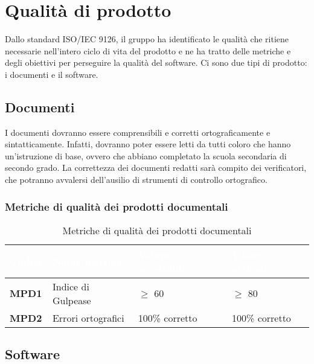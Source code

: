 \section{Qualità di prodotto}
Dallo standard ISO/IEC 9126, il gruppo \Gruppo{} ha identificato le qualità che ritiene necessarie nell'intero ciclo di vita del prodotto e ne ha tratto delle metriche e degli obiettivi per perseguire la qualità del software. Ci sono due tipi di prodotto: i documenti e il software.

\subsection{Documenti}
I documenti dovranno essere comprensibili e corretti ortograficamente e sintatticamente. Infatti, dovranno poter essere letti da tutti coloro che hanno un'istruzione di base, ovvero che abbiano completato la scuola secondaria di secondo grado. La correttezza dei documenti redatti sarà compito dei verificatori, che potranno avvalersi dell'ausilio di strumenti di controllo ortografico. 

\subsubsection{Metriche di qualità dei prodotti documentali}
\renewcommand{\arraystretch}{1.5}
\begin{longtable}{C{2.5cm} C{5.5cm} C{3.5cm} C{3.5cm}}
\textcolor{white}{\textbf{Codice}}&
\textcolor{white}{\textbf{Nome metrica}}&
\textcolor{white}{\textbf{Valore accettabile}}&
\textcolor{white}{\textbf{Valore ottimale}}\\	
\endhead
\endfoot
{}\caption{Metriche di qualità dei prodotti documentali}
\endlastfoot
		\textbf{MPD1} & Indice di Gulpease & $\geq$ 60 & $\geq$ 80\\
		\textbf{MPD2} & Errori ortografici & 100\% corretto & 100\% corretto \\
\end{longtable}

\subsection{Software}

